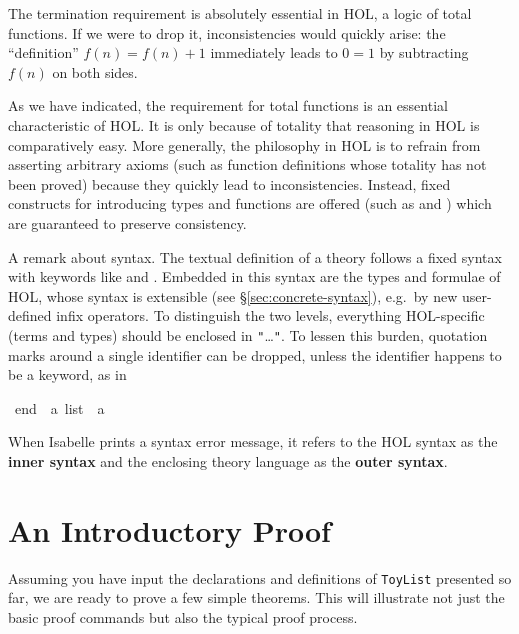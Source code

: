 \begin{isabellebody}
\begin{isamarkuptext}
The termination requirement is absolutely essential in HOL, a logic of total
functions. If we were to drop it, inconsistencies would quickly arise: the
``definition'' $f(n) = f(n)+1$ immediately leads to $0 = 1$ by subtracting
$f(n)$ on both sides.

\begin{warn}
  As we have indicated, the requirement for total functions is an essential characteristic of HOL\@. It is only
  because of totality that reasoning in HOL is comparatively easy.  More
  generally, the philosophy in HOL is to refrain from asserting arbitrary axioms (such as
  function definitions whose totality has not been proved) because they
  quickly lead to inconsistencies. Instead, fixed constructs for introducing
  types and functions are offered (such as  and
  ) which are guaranteed to preserve consistency.
\end{warn}

%
A remark about syntax.  The textual definition of a theory follows a fixed
syntax with keywords like  and .
Embedded in this syntax are the types and formulae of HOL, whose syntax is
extensible (see \S\ref{sec:concrete-syntax}), e.g.\ by new user-defined infix operators.
To distinguish the two levels, everything
HOL-specific (terms and types) should be enclosed in
\texttt{"}\dots\texttt{"}. 
To lessen this burden, quotation marks around a single identifier can be
dropped, unless the identifier happens to be a keyword, as in%
\end{isamarkuptext}%
\isamarkuptrue%
\ {\isachardoublequote}end{\isachardoublequote}\ {\isacharcolon}{\isacharcolon}\ {\isachardoublequote}{\isacharprime}a\ list\ {\isasymRightarrow}\ {\isacharprime}a{\isachardoublequote}\isamarkupfalse%
%
\begin{isamarkuptext}%
\noindent
When Isabelle prints a syntax error message, it refers to the HOL syntax as
the \textbf{inner syntax} and the enclosing theory language as the \textbf{outer syntax}.


\section{An Introductory Proof}
\label{sec:intro-proof}

Assuming you have input the declarations and definitions of \texttt{ToyList}
presented so far, we are ready to prove a few simple theorems. This will
illustrate not just the basic proof commands but also the typical proof
process.


\end{isamarkuptext}
\end{isabellebody}
